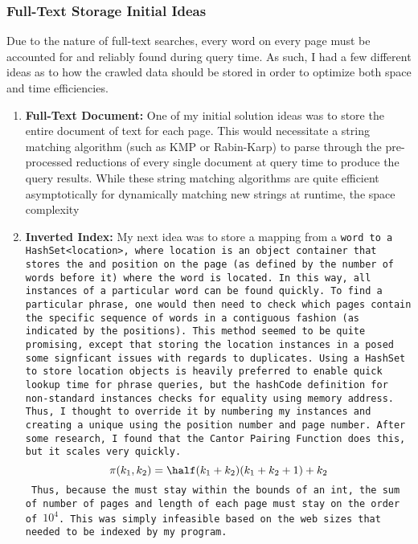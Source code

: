 \documentclass[11pt]{article}
\begin{document}
\subsubsection{Full-Text Storage Initial Ideas}
Due to the nature of full-text searches, every word on every page must be accounted for and reliably found during query time. As such, I had a few different ideas as to how the crawled data should be stored in order to optimize both space and time efficiencies. 
\begin{enumerate}
	\item \textbf{Full-Text Document: } One of my initial solution ideas was to store the entire document of text for each page. This would necessitate a string matching algorithm (such as KMP or Rabin-Karp) to parse through the pre-processed reductions of every single document at query time to produce the query results. While these string matching algorithms are quite efficient asymptotically for dynamically matching new strings at runtime, the space complexity 
	\item \textbf{Inverted Index: } My next idea was to store a mapping from a \tt{word} to a \tt{HashSet<location>}, where \tt{location} is an object container that stores the \Page{} and position on the page (as defined by the number of words before it) where the \tt{word} is located. In this way, all instances of a particular word can be found quickly. To find a particular phrase, one would then need to check which pages contain the specific sequence of words in a contiguous fashion (as indicated by the positions). This method seemed to be quite promising, except that storing the \tt{location} instances in a \hse{} posed some signficant issues with regards to duplicates. 
	Using a \tt{HashSet} to store \tt{location} objects is heavily preferred to enable quick lookup time for phrase queries, but the \tt{hashCode} definition for non-standard instances checks for equality using memory address. Thus, I thought to override it by numbering my \Page{} instances and creating a unique \hc{} using the position number and page number. After some research, I found that the Cantor Pairing Function does this, but it scales very quickly.
	\[
	\pi(k_1, k_2) = \half(k_1+k_2)(k_1+k_2+1) + k_2
	\]
	Thus, because the \hc{} must stay within the bounds of an \tt{int}, the sum of number of pages and length of each page must stay on the order of $10^4$. This was simply infeasible based on the web sizes that needed to be indexed by my program.
\end{enumerate}	
\end{document}
